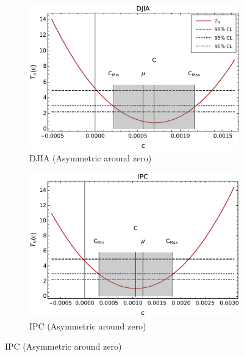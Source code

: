 \documentclass{elsarticle}
\begin{document}
\begin{figure}[h!tb]
        \centering
        \begin{subfigure}[b]{0.45\textwidth}
            \centering
            \includegraphics[width=\textwidth]{figures/SymmetryPlots/simetria_TReturns_DJIA.pdf}
            \caption[ ]%
            {{\small DJIA (Asymmetric around zero)}}
            \label{fig:TRetsFigsDJIA}
        \end{subfigure}
        \quad
        \begin{subfigure}[b]{0.45\textwidth}
            \centering 
            \includegraphics[width=\textwidth]{figures/SymmetryPlots/simetria_TReturns_IPC.pdf}
            \caption[ ]%
            {{\small IPC (Asymmetric around zero)}}
            \label{fig:TRetsFigsIPC}
        \end{subfigure}

\end{figure}
\end{document}

